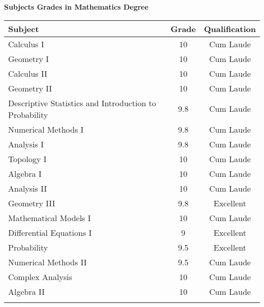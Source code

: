 \documentclass[10pt,a4paper,sans]{moderncv} %
\begin{document}
	\centerline{\textbf{Subjects Grades in Mathematics Degree}}
	\kern 2mm
	\centering \begin{tabular}{lcc}
		\toprule
		\textbf{Subject} & \textbf{ Grade } & \textbf{ Qualification}   \\ 
		\midrule
		Calculus I                                              & 10  & Cum Laude  \\ 
		Geometry I                                              & 10  & Cum Laude  \\
		Calculus II                                             & 10  & Cum Laude  \\ 
		Geometry II                                             & 10  & Cum Laude  \\
		Descriptive Statistics and Introduction to Probability  & 9.8 & Cum Laude  \\
		Numerical Methods I                                     & 9.8 & Cum Laude  \\
		Analysis I                                              & 9.8 & Cum Laude  \\
		Topology I                                              & 10  & Cum Laude  \\
		Algebra I                                               & 10  & Cum Laude  \\
		Analysis II                                             & 10  & Cum Laude  \\
		Geometry III                                            & 9.8 & Excellent  \\
		Mathematical Models I                                   & 10  & Cum Laude  \\
		Differential Equations I                                & 9   & Excellent  \\
		Probability                                             & 9.5 & Excellent  \\
		Numerical Methods II                                    & 9.5 & Cum Laude  \\
		Complex Analysis                                        & 10  & Cum Laude  \\
		Algebra II                                              & 10  & Cum Laude  \\
		\bottomrule
		\\
	\end{tabular}

\end{document}
